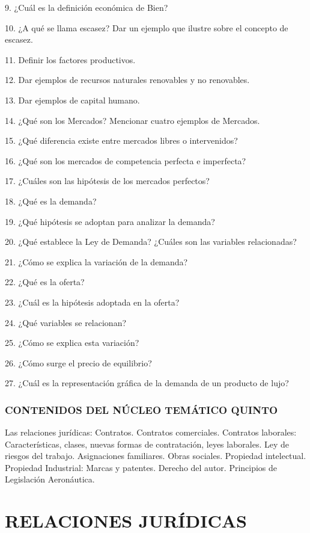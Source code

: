 9. ¿Cuál es la definición económica de Bien?

10. ¿A qué se llama escasez? Dar un ejemplo que ilustre sobre el concepto de escasez.



11. Definir los factores productivos.

12. Dar ejemplos de recursos naturales renovables y no renovables.

13. Dar ejemplos de capital humano.

14. ¿Qué son los Mercados? Mencionar cuatro ejemplos de Mercados.

15. ¿Qué diferencia existe entre mercados libres o intervenidos?

16. ¿Qué son los mercados de competencia perfecta e imperfecta?

17. ¿Cuáles son las hipótesis de los mercados perfectos?

18. ¿Qué es la demanda?

19. ¿Qué hipótesis se adoptan para analizar la demanda?

20. ¿Qué establece la Ley de Demanda? ¿Cuáles son las variables relacionadas?

21. ¿Cómo se explica la variación de la demanda?

22. ¿Qué es la oferta?

23. ¿Cuál es la hipótesis adoptada en la oferta?

24. ¿Qué variables se relacionan?

25. ¿Cómo se explica esta variación?

26. ¿Cómo surge el precio de equilibrio?

27. ¿Cuál es la representación gráfica de la demanda de un producto de lujo?



\subsubsection*{CONTENIDOS DEL NÚCLEO TEMÁTICO QUINTO}
Las relaciones jurídicas: Contratos. Contratos comerciales. Contratos laborales: Características, clases, nuevas formas de contratación, leyes laborales. Ley de riesgos del trabajo. Asignaciones familiares. Obras sociales. Propiedad intelectual. Propiedad Industrial: Marcas y patentes. Derecho del autor. Principios de Legislación Aeronáutica.

\section*{RELACIONES JURÍDICAS}
